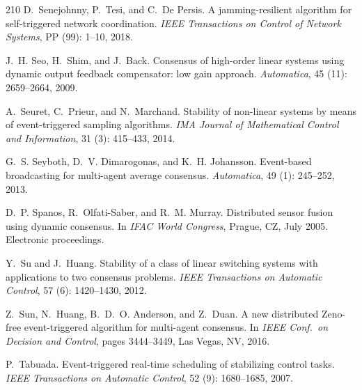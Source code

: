 \documentclass{autart}
\begin{document}
{\begin{thebibliography}{210}
D.~Senejohnny, P.~Tesi, and C.~{De Persis}.
\newblock A jamming-resilient algorithm for self-triggered network
  coordination.
\newblock \emph{IEEE Transactions on Control of Network Systems}, PP
  (99): 1--10, 2018.

J.~H. Seo, H.~Shim, and J.~Back.
\newblock Consensus of high-order linear systems using dynamic output feedback
  compensator: low gain approach.
\newblock \emph{Automatica}, 45 (11): 2659--2664, 2009.

A.~Seuret, C.~Prieur, and N.~Marchand.
\newblock Stability of non-linear systems by means of event-triggered sampling
  algorithms.
\newblock \emph{IMA Journal of Mathematical Control and Information},
  31 (3): 415--433, 2014.

G.~S. Seyboth, D.~V. Dimarogonas, and K.~H. Johansson.
\newblock Event-based broadcasting for multi-agent average consensus.
\newblock \emph{Automatica}, 49 (1): 245--252, 2013.

D.~P. Spanos, R.~Olfati-Saber, and R.~M. Murray.
\newblock Distributed sensor fusion using dynamic consensus.
\newblock In \emph{{IFAC} {W}orld {C}ongress}, Prague, CZ, July 2005.
\newblock Electronic proceedings.

Y.~Su and J.~Huang.
\newblock Stability of a class of linear switching systems with applications to
  two consensus problems.
\newblock \emph{IEEE Transactions on Automatic Control}, 57
  (6): 1420--1430, 2012.

Z.~Sun, N.~Huang, B.~D.~O. Anderson, and Z.~Duan.
\newblock A new distributed {Z}eno-free event-triggered algorithm for
  multi-agent consensus.
\newblock In \emph{{IEEE} Conf.\ on Decision and Control}, pages 3444--3449,
  Las Vegas, NV, 2016.

P.~Tabuada.
\newblock Event-triggered real-time scheduling of stabilizing control tasks.
\newblock \emph{IEEE Transactions on Automatic Control}, 52
  (9): 1680--1685, 2007.


\end{thebibliography}}
\end{document}
